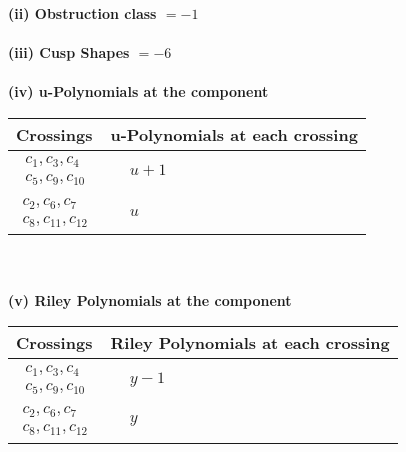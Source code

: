 \documentclass[1p]{elsarticle_modified}
\theoremstyle{definition}
\begin{document}
\flushleft \textbf{(ii) Obstruction class $= -1$}\\~\\
\flushleft \textbf{(iii) Cusp Shapes $= -6$}\\~\\
\newpage\renewcommand{\arraystretch}{1}
\flushleft \textbf{(iv) u-Polynomials at the component}\newline \\
\begin{tabular}{m{50pt}|m{274pt}}
Crossings & \hspace{64pt}u-Polynomials at each crossing \\
\hline $$\begin{aligned}c_{1},c_{3},c_{4}\\c_{5},c_{9},c_{10}\end{aligned}$$&$\begin{aligned}
&u+1
\end{aligned}$\\
\hline $$\begin{aligned}c_{2},c_{6},c_{7}\\c_{8},c_{11},c_{12}\end{aligned}$$&$\begin{aligned}
&u
\end{aligned}$\\
\hline
\end{tabular}\\~\\
\newpage\renewcommand{\arraystretch}{1}
\flushleft \textbf{(v) Riley Polynomials at the component}\newline \\
\begin{tabular}{m{50pt}|m{274pt}}
Crossings & \hspace{64pt}Riley Polynomials at each crossing \\
\hline $$\begin{aligned}c_{1},c_{3},c_{4}\\c_{5},c_{9},c_{10}\end{aligned}$$&$\begin{aligned}
&y-1
\end{aligned}$\\
\hline $$\begin{aligned}c_{2},c_{6},c_{7}\\c_{8},c_{11},c_{12}\end{aligned}$$&$\begin{aligned}
&y
\end{aligned}$\\
\hline
\end{tabular}\\~\\
\end{document}
